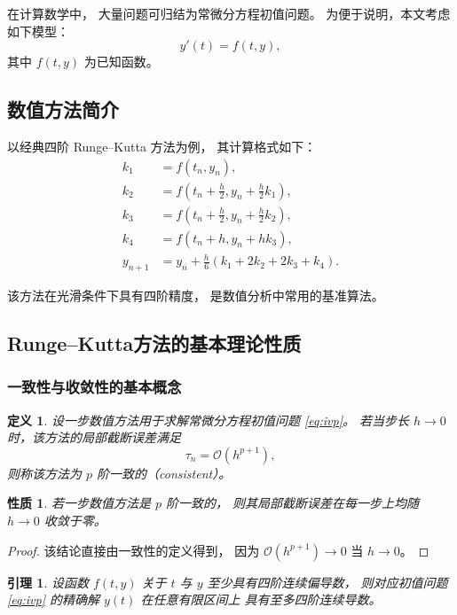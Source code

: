 \documentclass[UTF8, a4paper, zihao=-4]{ctexart} %
\newtheorem{definition}{定义}[section]
\newtheorem{lemma}{引理}[section]
\newtheorem{proposition}{性质}[section]
\numberwithin{equation}{section}%
\begin{document}
在计算数学中，
大量问题可归结为常微分方程初值问题。
为便于说明，本文考虑如下模型：
\begin{equation}
y'(t) = f(t,y),
\end{equation}
其中 $f(t,y)$ 为已知函数。

\subsection{数值方法简介}

以经典四阶 Runge--Kutta 方法为例，
其计算格式如下：
\begin{align}
k_1 &= f(t_n, y_n),\\
k_2 &= f\left(t_n+\frac{h}{2}, y_n+\frac{h}{2}k_1\right),\\
k_3 &= f\left(t_n+\frac{h}{2}, y_n+\frac{h}{2}k_2\right),\\
k_4 &= f(t_n+h, y_n+hk_3),\\
y_{n+1} &= y_n + \frac{h}{6}(k_1+2k_2+2k_3+k_4).
\end{align}

该方法在光滑条件下具有四阶精度，
是数值分析中常用的基准算法。

\subsection{Runge--Kutta方法的基本理论性质}

\subsubsection{一致性与收敛性的基本概念}

\begin{definition}
设一步数值方法用于求解常微分方程初值问题 \eqref{eq:ivp}。
若当步长 $h \to 0$ 时，该方法的局部截断误差满足
\[
\tau_n = \mathcal{O}(h^{p+1}),
\]
则称该方法为 $p$ 阶一致的（consistent）。
\end{definition}

\begin{proposition}
若一步数值方法是 $p$ 阶一致的，
则其局部截断误差在每一步上均随 $h \to 0$ 收敛于零。
\end{proposition}

\begin{proof}
该结论直接由一致性的定义得到，
因为 $\mathcal{O}(h^{p+1}) \to 0$ 当 $h \to 0$。
\end{proof}

\begin{lemma}
\label{lem:smoothness}
设函数 $f(t,y)$ 关于 $t$ 与 $y$ 至少具有四阶连续偏导数，
则对应初值问题 \eqref{eq:ivp} 的精确解 $y(t)$ 在任意有限区间上
具有至多四阶连续导数。
\end{lemma}
\end{document}
